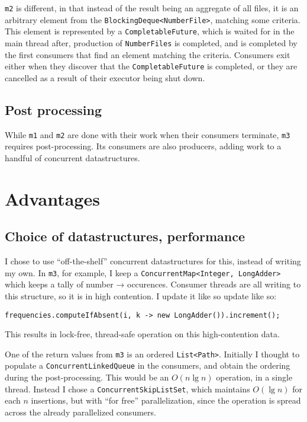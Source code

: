 \documentclass[a4paper,11pt]{article}
\begin{document}
\texttt{m2} is different, in that instead of the result being an
aggregate of all files, it is an arbitrary element from the
\texttt{BlockingDeque<NumberFile>}, matching some criteria.  This
element is represented by a \texttt{CompletableFuture}, which is
waited for in the main thread after, production of
\texttt{NumberFiles} is completed, and is completed by the first
consumers that find an element matching the criteria.  Consumers exit
either when they discover that the \texttt{CompletableFuture} is
completed, or they are cancelled as a result of their executor being
shut down.

\subsection{Post processing}

While \texttt{m1} and \texttt{m2} are done with their work when their
consumers terminate, \texttt{m3} requires post-processing.  Its
consumers are also producers, adding work to a handful of concurrent
datastructures.   

\section{Advantages}

\subsection{Choice of datastructures, performance}

I chose to use ``off-the-shelf'' concurrent datastructures for this,
instead of writing my own.  In \texttt{m3}, for example, I keep a
\texttt{ConcurrentMap<Integer, LongAdder>} which keeps a tally of
number → occurences.  Consumer threads are all writing to this
structure, so it is in high contention.  I update it like so
update like so:

\begin{verbatim}
frequencies.computeIfAbsent(i, k -> new LongAdder()).increment();
\end{verbatim}

This results in lock-free, thread-safe operation on this
high-contention data.

One of the return values from \texttt{m3} is an ordered
\texttt{List<Path>}.  Initially I thought to populate a
\texttt{ConcurrentLinkedQueue} in the consumers, and obtain the
ordering during the post-processing.  This would be an \(O(n \lg n) \)
operation, in a single thread.  Instead I chose a
\texttt{ConcurrentSkipListSet}, which maintains $O(\lg n)$ for each
$n$ insertions, but with ``for free'' parallelization, since the
operation is spread across the already parallelized consumers.
\end{document}
